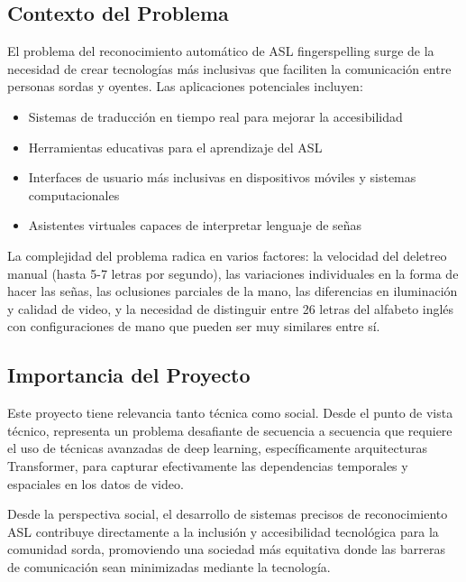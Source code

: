 \documentclass[12pt,a4paper]{article}
\begin{document}
\subsection{Contexto del Problema}

El problema del reconocimiento automático de ASL fingerspelling surge de la necesidad de crear tecnologías más inclusivas que faciliten la comunicación entre personas sordas y oyentes. Las aplicaciones potenciales incluyen:

\begin{itemize}
    \item Sistemas de traducción en tiempo real para mejorar la accesibilidad
    \item Herramientas educativas para el aprendizaje del ASL
    \item Interfaces de usuario más inclusivas en dispositivos móviles y sistemas computacionales
    \item Asistentes virtuales capaces de interpretar lenguaje de señas
\end{itemize}

La complejidad del problema radica en varios factores: la velocidad del deletreo manual (hasta 5-7 letras por segundo), las variaciones individuales en la forma de hacer las señas, las oclusiones parciales de la mano, las diferencias en iluminación y calidad de video, y la necesidad de distinguir entre 26 letras del alfabeto inglés con configuraciones de mano que pueden ser muy similares entre sí.

\subsection{Importancia del Proyecto}

Este proyecto tiene relevancia tanto técnica como social. Desde el punto de vista técnico, representa un problema desafiante de secuencia a secuencia que requiere el uso de técnicas avanzadas de deep learning, específicamente arquitecturas Transformer, para capturar efectivamente las dependencias temporales y espaciales en los datos de video.

Desde la perspectiva social, el desarrollo de sistemas precisos de reconocimiento ASL contribuye directamente a la inclusión y accesibilidad tecnológica para la comunidad sorda, promoviendo una sociedad más equitativa donde las barreras de comunicación sean minimizadas mediante la tecnología.

\end{document}
